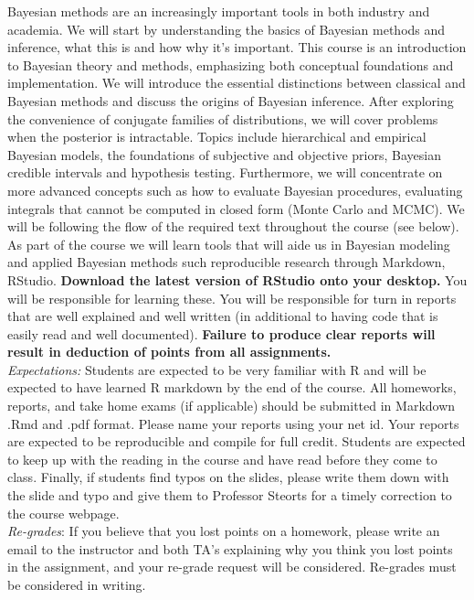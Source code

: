 \documentclass[11pt]{article}
\begin{document}
Bayesian methods are an increasingly important tools
in both industry and academia. We will start by understanding the basics of Bayesian methods and inference, what this is and how why it's important. 
This course is an introduction to Bayesian theory and methods, emphasizing both conceptual foundations and implementation. We will introduce the essential distinctions between classical and Bayesian methods and discuss the origins of Bayesian inference. After exploring the convenience of conjugate families of distributions, we will cover problems when the posterior is intractable. Topics include hierarchical and empirical Bayesian models, the foundations of subjective and objective priors, Bayesian credible intervals and hypothesis testing. Furthermore, we 
will  concentrate on more advanced concepts such as how to evaluate Bayesian procedures, evaluating integrals that cannot be computed in closed form (Monte Carlo and MCMC). We will be following the flow of the required text throughout the course (see below). \\

As part of the course we will learn tools that will aide us in Bayesian modeling and applied Bayesian methods such reproducible research through Markdown, RStudio. \textbf{Download the latest version of RStudio onto your desktop.} You will be responsible for learning these. You will be responsible for turn in reports that are well explained and well written (in additional to having code that is easily read and well documented). \textbf{Failure to produce clear reports will result in deduction of points from all assignments.} 
\\

\emph{Expectations:} Students are expected to be very familiar with R and will be expected to have learned R markdown by the end of the course. All homeworks, reports, and take home exams (if applicable) should be submitted in Markdown .Rmd and .pdf format. Please name your reports using your net id. Your reports are expected to be reproducible and compile for full credit. Students are expected to keep up with the reading in the course and have read before they come to class. Finally, if students find typos on the slides, please write them down with the slide and typo and give them to Professor Steorts for a timely correction to the course webpage.  \\

\emph{Re-grades}: If you believe that you lost points on a homework, please write an email to the instructor and both TA's explaining why you think you lost points in the assignment, and your re-grade request will be considered. Re-grades must be considered in writing. \\
\end{document}
